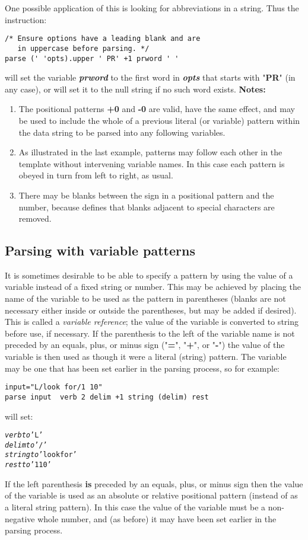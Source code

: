  One possible application of this is looking for abbreviations in a
string. Thus the instruction:
\begin{lstlisting}
/* Ensure options have a leading blank and are
   in uppercase before parsing. */
parse (' 'opts).upper ' PR' +1 prword ' '
\end{lstlisting}
will set the variable \textbf{\emph{prword}} to the first word
in \textbf{\emph{opts}} that starts with "\textbf{PR}" (in
any case), or will set it to the null string if no such word exists.
 \textbf{Notes:}
\begin{enumerate}
\item The positional patterns \textbf{+0} and \textbf{-0} are valid,
have the same effect, and may be used to include the whole of a previous
literal (or variable) pattern within the data string to be parsed into
any following variables.
\item As illustrated in the last example, patterns may follow each other
in the template without intervening variable names.  In this case each
pattern is obeyed in turn from left to right, as usual.
\item There may be blanks between the sign in a positional pattern and
the number, because \nr{} defines that blanks adjacent to special
characters are removed.
\end{enumerate}
\subsection{Parsing with variable patterns}
 It is sometimes desirable to be able to specify a pattern by using
the value of a variable instead of a fixed string or number.
This may be achieved by placing the name of the variable to be used as
the pattern in parentheses (blanks are not necessary either inside or
outside the parentheses, but may be added if desired).
This is called a \emph{variable reference}; the value of the variable
is converted to string before use, if necessary.
 If the parenthesis to the left of the variable name is not preceded
by an equals, plus, or minus sign ("\textbf{=}",
"\textbf{+}", or "\textbf{-}")
the value of the variable is then used as though it were a literal
(string) pattern.
The variable may be one that has been set earlier in the parsing
process, so for example:
\begin{lstlisting}
input="L/look for/1 10"
parse input  verb 2 delim +1 string (delim) rest
\end{lstlisting}
will set:
\begin{alltt}
\emph{verb} \emph{to} 'L'
\emph{delim} \emph{to} '/'
\emph{string} \emph{to} 'look for'
\emph{rest} \emph{to} '1 10'
\end{alltt}
 If the left parenthesis \textbf{is} preceded by an equals, plus,
or minus sign then the value of the variable is used as an absolute or
relative positional pattern (instead of as a literal string pattern).
In this case the value of the variable must be a non-negative
whole number, and (as before) it may have been set earlier in the
parsing process.
\index{,}
\index{,}
\index{,}
\index{,}
